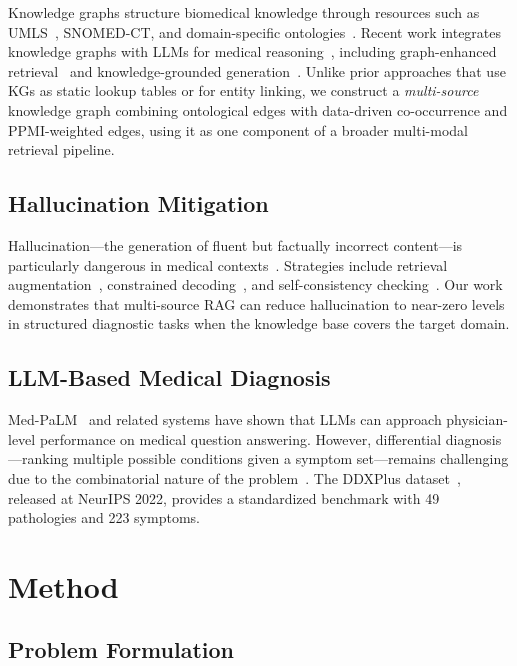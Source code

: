 \documentclass[preprint,12pt]{elsarticle}
\begin{document}
Knowledge graphs structure biomedical knowledge through resources such as UMLS~\cite{bodenreider2004unified}, SNOMED-CT, and domain-specific ontologies~\cite{santos2022knowledge,chandak2023building}. Recent work integrates knowledge graphs with LLMs for medical reasoning~\cite{pan2024unifying}, including graph-enhanced retrieval~\cite{he2024gretriever} and knowledge-grounded generation~\cite{yasunaga2022deep}. Unlike prior approaches that use KGs as static lookup tables or for entity linking, we construct a \emph{multi-source} knowledge graph combining ontological edges with data-driven co-occurrence and PPMI-weighted edges, using it as one component of a broader multi-modal retrieval pipeline.

\subsection{Hallucination Mitigation}

Hallucination---the generation of fluent but factually incorrect content---is particularly dangerous in medical contexts~\cite{ji2023survey,umapathi2023med}. Strategies include retrieval augmentation~\cite{shuster2021retrieval}, constrained decoding~\cite{lu2022neurologic}, and self-consistency checking~\cite{manakul2023selfcheckgpt}. Our work demonstrates that multi-source RAG can reduce hallucination to near-zero levels in structured diagnostic tasks when the knowledge base covers the target domain.

\subsection{LLM-Based Medical Diagnosis}

Med-PaLM~\cite{singhal2023large} and related systems have shown that LLMs can approach physician-level performance on medical question answering. However, differential diagnosis---ranking multiple possible conditions given a symptom set---remains challenging due to the combinatorial nature of the problem~\cite{mcduff2023towards}. The DDXPlus dataset~\cite{fansi2022ddxplus}, released at NeurIPS 2022, provides a standardized benchmark with 49 pathologies and 223 symptoms.

\section{Method}
\label{sec:method}

\subsection{Problem Formulation}
\end{document}
